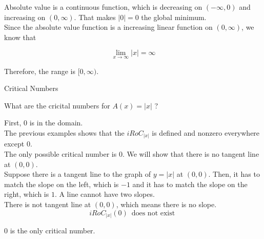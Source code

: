 \documentclass{ximera}
\begin{document}
Absolute value is a continuous function, which is decreasing on $(-\infty, 0)$ and increasing on $(0, \infty)$. That makes $| 0 | = 0$ the global minimum. \\


Since the absolute value function is a increasing linear function on $(0, \infty)$, we know that

\[
\lim\limits_{x \to \infty}| x | = \infty
\]



Therefore, the range is $[0, \infty)$.








\begin{example}  Critical Numbers


What are the cricital numbers for $A(x) = | x |$ ?



\begin{explanation}


First, $0$ is in the domain. \\

The previous examples shows that the $iRoC_{|x|}$ is defined and nonzero everywhere except $0$. \\

The only possible critical number is $0$.  We will show that there is no tangent line at $(0,0)$. \\


Suppose there is a tangent line to the graph of $y = | x |$ at $(0,0)$.  Then, it has to match the slope on the left, which is $-1$ and it has to match the slope on the right, which is $1$.  A line cannot have two slopes. \\ 


There is not tangent line at $(0,0)$, which means there is no slope. \\



\[
iRoC_{|x|}(0) \, \text{ does not exist }
\]


$0$ is the only critical number.



\end{explanation}


\end{example}
\end{document}
